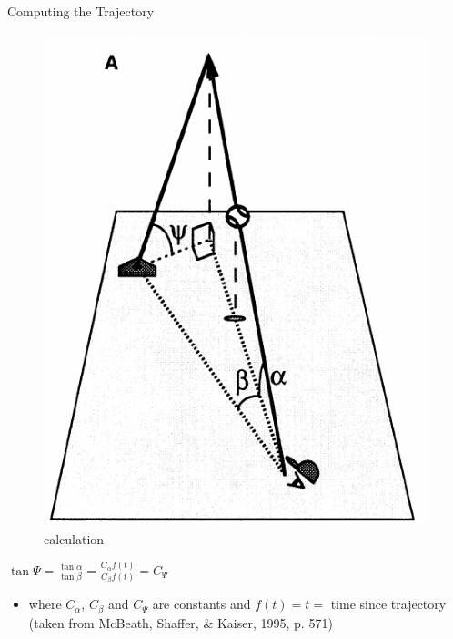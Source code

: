 \documentclass[
  ignorenonframetext,
]{beamer}
\providecommand{\tightlist}{%
  \setlength{\itemsep}{0pt}\setlength{\parskip}{0pt}}\usepackage{longtable,booktabs,array}
\begin{document}
\begin{frame}{Computing the Trajectory}
\protect\hypertarget{computing-the-trajectory}{}
\begin{figure}

{\centering \includegraphics{resources/images/gaze_calculation.png}

}

\caption{calculation}

\end{figure}

\(\tan{\Psi} = \frac{\tan{\alpha}}{\tan{\beta}} = \frac{C_\alpha f(t)}{C_\beta f(t)} = C_\Psi\)

\begin{itemize}
\tightlist
\item
  where \(C_\alpha\), \(C_\beta\) and \(C_\Psi\) are constants and
  \(f(t) = t =\) time since trajectory (taken from McBeath, Shaffer, \&
  Kaiser, 1995, p. 571)
\end{itemize}
\end{frame}
\end{document}

